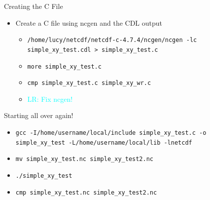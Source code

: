 \documentclass[compress,11pt,xcolor=svgnames,aspectratio=169]{beamer}
\newcommand{\lr}[1]{\textcolor{cyan}{LR: #1}}
\begin{document}
\begin{frame}[fragile]{Creating the C File}

\begin{itemize}
\setlength\itemsep{0.5cm}

  \item Create a C file using ncgen and the CDL output

    \begin{itemize}

      \item \verb|/home/lucy/netcdf/netcdf-c-4.7.4/ncgen/ncgen -lc simple_xy_test.cdl > simple_xy_test.c|
      \item \verb|more simple_xy_test.c|
      \item \verb|cmp simple_xy_test.c simple_xy_wr.c|
      \item \lr{Fix ncgen!}

    \end{itemize}

\end{itemize}

\end{frame}

\begin{frame}[fragile]{Starting all over again!}

\begin{itemize}

  \item \verb|gcc -I/home/username/local/include simple_xy_test.c -o simple_xy_test -L/home/username/local/lib -lnetcdf|
  \item \verb|mv simple_xy_test.nc simple_xy_test2.nc|
  \item \verb|./simple_xy_test|
  \item \verb|cmp simple_xy_test.nc simple_xy_test2.nc|

\end{itemize}

\end{frame}
\end{document}
